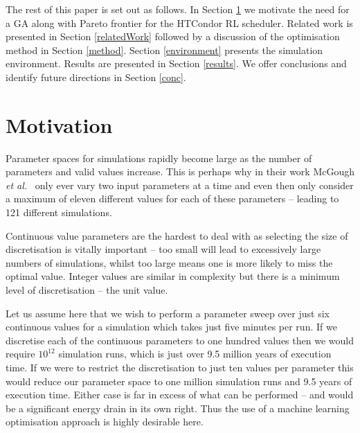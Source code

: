\documentclass[10pt, conference, compsocconf]{IEEEtran}
\begin{document}
The rest of this paper is set out as follows. In Section \ref{motivation} we motivate the need for a GA along with Pareto frontier for the HTCondor RL scheduler. Related work is presented in Section \ref{relatedWork} followed by a discussion of the optimisation method in Section \ref{method}. Section \ref{environment} presents the simulation environment. Results are presented in Section \ref{results}. We offer conclusions and identify future directions in Section \ref{conc}.	
%
%
\section{Motivation}
\label{motivation}
Parameter spaces for simulations rapidly become large as the number of parameters and valid values increase. This is perhaps why in their work McGough \textit{et al.}~\cite{suscom} only ever vary two input parameters at a time and even then only consider a maximum of eleven different values for each of these parameters -- leading to 121 different simulations. 

Continuous value parameters are the hardest to deal with as selecting the size of discretisation is vitally important -- too small will lead to excessively large numbers of simulations, whilst too large means one is more likely to miss the optimal value. Integer values are similar in complexity but there is a minimum level of discretisation -- the unit value. 

Let us assume here that we wish to perform a parameter sweep over just six continuous values for a simulation which takes just five minutes per run. If we discretise each of the continuous parameters to one hundred values then we would require $10^{12}$ simulation runs, which is just over 9.5 million years of execution time. If we were to restrict the discretisation to just ten values per parameter this would reduce our parameter space to one million simulation runs and 9.5 years of execution time. Either case is far in excess of what can be performed -- and would be a significant energy drain in its own right. Thus the use of a machine learning optimisation approach is highly desirable here.
\end{document}
